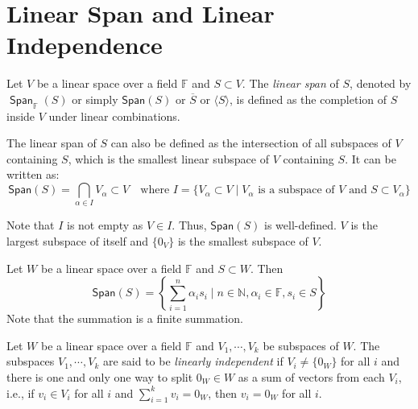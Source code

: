 \documentclass[
	11pt, %
	fleqn, %
	a4paper, %
]{LegrandOrangeBook}
\renewcommand{\span}[1]{\mathsf{Span}(#1)} %
\renewcommand{\bar}[1]{\overline{#1}} %
\newcommand{\F}{\mathbb{F}} %
\DeclareMathOperator{\Span}{\mathsf{Span}}
\begin{document}
\newpage

\section{Linear Span and Linear Independence}

\begin{definition}
    Let $V$ be a linear space over a field $\F$ and $S \subset V$. The \emph{linear span} of $S$, denoted by $\Span_\F (S)$ or simply $\span S$ or $\bar{S}$ or $\langle S \rangle$, is defined as the completion of $S$ inside $V$ under linear combinations.
\end{definition}

\begin{corollary}
    The linear span of $S$ can also be defined as the intersection of all subspaces of $V$ containing $S$, which is the smallest linear subspace of $V$ containing $S$. It can be written as:
    \[
        \span S = \bigcap_{\alpha \in I} V_{\alpha} \subset V \quad \text{where } I = \{ V_{\alpha} \subset V \mid V_{\alpha} \text{ is a subspace of } V \text{ and } S \subset V_{\alpha} \}
    \]
\end{corollary}

\begin{remark}
    Note that $I$ is not empty as $V \in I$. Thus, $\span S$ is well-defined. $V$ is the largest subspace of itself and $\{0_V\}$ is the smallest subspace of $V$.
\end{remark}

\begin{proposition}
    Let $W$ be a linear space over a field $\F$ and $S \subset W$. Then 
    \[
        \span S = \left\{ \sum_{i=1}^{n} \alpha_i s_i \mid n \in \mathbb{N}, \alpha_i \in \F, s_i \in S \right\}
    \]
    Note that the summation is a finite summation.
\end{proposition}

\begin{definition} \label{def:linear_independence}
    Let $W$ be a linear space over a field $\F$ and $V_1, \cdots, V_k$ be subspaces of $W$. The subspaces $V_1, \cdots, V_k$ are said to be \emph{linearly independent} if $V_i \neq \{0_W\}$ for all $i$ and there is one and only one way to split $0_W \in W$ as a sum of vectors from each $V_i$, i.e., if $v_i \in V_i$ for all $i$ and $\sum_{i=1}^{k} v_i = 0_W$, then $v_i = 0_W$ for all $i$.
\end{definition}
\end{document}
